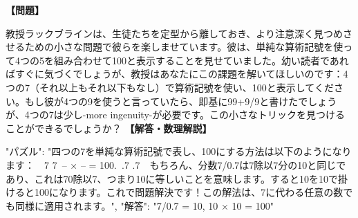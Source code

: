 \documentclass[10pt,a4paper,oneside,openany]{ltjsbook}
\begin{document}
\begin{tcolorbox}[colback=softblue,colframe=primaryblue,title=\textbf{第 95 問：THE FOUR SEVENS.},arc=2mm,boxrule=1pt,breakable]
\textbf{【問題】}\par\vspace{0.3em}
教授ラックブラインは、生徒たちを定型から離しておき、より注意深く見つめさせるための小さな問題で彼らを楽しませています。彼は、単純な算術記號を使って4つの5を組み合わせて100と表示することを見せていました。幼い読者であればすぐに気づくでしょうが、教授はあなたにこの課題を解いてほしいのです：4つの7（それ以上もそれ以下もなし）で算術記號を使い、100と表示してください。もし彼が4つの9を使うと言っていたら、即基に99+9/9と書けたでしょうが、4つの7は少し-more ingenuity-が必要です。この小さなトリックを見つけることができるでしょうか？
\tcblower
\textbf{【解答・数理解説】}\par\vspace{0.3em}
{
    "パズル": "四つの7を単純な算術記號で表し、100にする方法は以下のようになります：\
\
    7    7\
   -- × -- = 100.\
    .7   .7\
\
もちろん、分数7/0.7は7除以7分の10と同じであり、これは70除以7、つまり10に等しいことを意味します。すると10を10で掛けると100になります。これで問題解決です！この解法は、7に代わる任意の数でも同様に適用されます。",
    "解答": "7/0.7 = 10, 10 × 10 = 100"
}
\end{tcolorbox}
\end{document}

